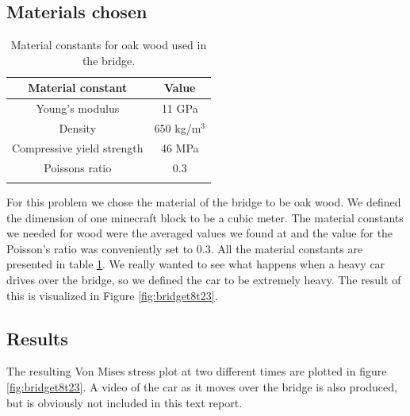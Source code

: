 \subsection{Materials chosen}
\begin{table}
\center
\caption{Material constants for oak wood used in the bridge.} 
\begin{tabular}{cc}
Material constant & Value \\ 
\hline 
Young's modulus & 11 GPa \\ 
Density & 650 kg/m$^3$ \\ 
Compressive yield strength & 46 MPa \\ 
Poissons ratio & 0.3 \\ 
\label{tab:oak}
\end{tabular}
\end{table}


For this problem we chose the material of the bridge to be oak wood. We defined the dimension of one minecraft block to be a cubic meter. The material constants we needed for wood were the averaged values we found at \cite{oak} and the value for the Poisson's ratio was conveniently set to 0.3. All the material constants are presented in table \ref{tab:oak}. We really wanted to see what happens when a heavy car drives over the bridge, so we defined the car to be extremely heavy. The result of this is visualized in Figure \ref{fig:bridget8t23}.

\subsection{Results}
The resulting Von Mises stress plot at two different times are plotted in figure \ref{fig:bridget8t23}. A video of the car as it moves over the bridge is also produced, but is obviously not included in this text report.

